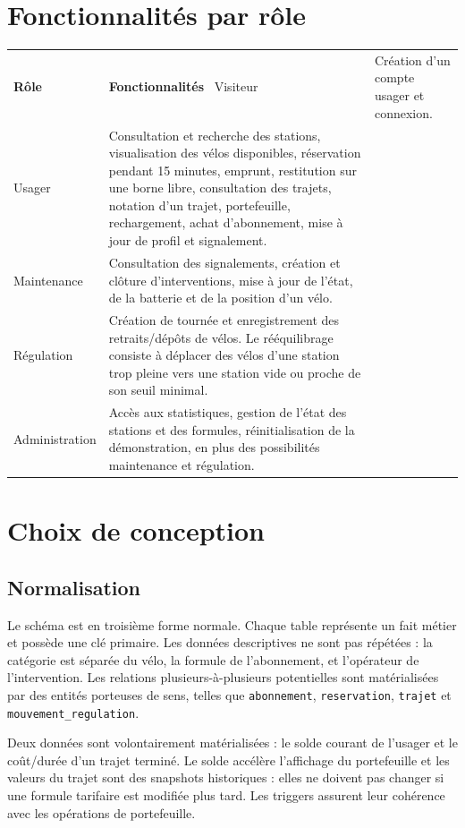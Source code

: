 \documentclass[11pt,a4paper]{article}
\begin{document}
\section{Fonctionnalités par rôle}
\begin{tabularx}{\textwidth}{p{}X}
\toprule
\textbf{Rôle} & \textbf{Fonctionnalités}\
\midrule
Visiteur & Création d'un compte usager et connexion.\\
Usager & Consultation et recherche des stations, visualisation des vélos disponibles, réservation pendant 15 minutes, emprunt, restitution sur une borne libre, consultation des trajets, notation d'un trajet, portefeuille, rechargement, achat d'abonnement, mise à jour de profil et signalement.\\
Maintenance & Consultation des signalements, création et clôture d'interventions, mise à jour de l'état, de la batterie et de la position d'un vélo.\\
Régulation & Création de tournée et enregistrement des retraits/dépôts de vélos. Le rééquilibrage consiste à déplacer des vélos d'une station trop pleine vers une station vide ou proche de son seuil minimal.\\
Administration & Accès aux statistiques, gestion de l'état des stations et des formules, réinitialisation de la démonstration, en plus des possibilités maintenance et régulation.\\
\bottomrule
\end{tabularx}

\section{Choix de conception}
\subsection{Normalisation}
Le schéma est en troisième forme normale. Chaque table représente un fait métier et possède une clé primaire. Les données descriptives ne sont pas répétées : la catégorie est séparée du vélo, la formule de l'abonnement, et l'opérateur de l'intervention. Les relations plusieurs-à-plusieurs potentielles sont matérialisées par des entités porteuses de sens, telles que \texttt{abonnement}, \texttt{reservation}, \texttt{trajet} et \texttt{mouvement\_regulation}.

Deux données sont volontairement matérialisées : le solde courant de l'usager et le coût/durée d'un trajet terminé. Le solde accélère l'affichage du portefeuille et les valeurs du trajet sont des snapshots historiques : elles ne doivent pas changer si une formule tarifaire est modifiée plus tard. Les triggers assurent leur cohérence avec les opérations de portefeuille.
\end{document}
